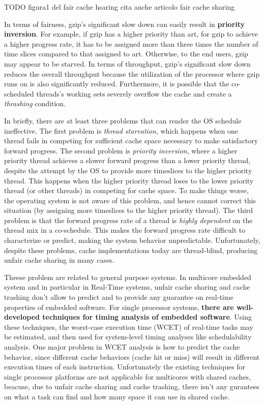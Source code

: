 \documentclass[a4paper,10pt]{article}
\begin{document}
\begin{multicols}{2}
TODO figura1 del fair cache hsaring cita anche articolo fair cache sharing


In terms of fairness, gzip's significant slow down can easily result in \textbf{priority inversion}. 
For example, if gzip has a higher priority than art, for gzip to achieve a higher progress rate, it has to be assigned more than three times the 
number of time slices compared to that assigned to art. Otherwise, to the end users, gzip may appear to be starved. In terms of throughput,
gzip's significant slow down reduces the overall throughput because the utilization of the processor where gzip runs on is also significantly reduced. 
Furthermore, it is possible that the co-scheduled threads's working sets severely overflow the cache and create a \textit{thrashing} condition.

In briefly, there are at least three problems that can render the OS schedule ineffective.
The first problem is \textit{thread starvation}, which happens when one thread fails in competing for sufficient cache space necessary to make 
satisfactory forward progress. The second problem is \textit{priority inversion}, where a higher priority thread achieves a slower forward
progress than a lower priority thread, despite the attempt by the OS to provide more timeslices to the higher priority thread.
This happens when the higher priority thread loses to the lower priority thread (or other threads) in competing
for cache space. To make things worse, the operating system is not aware of this problem, and hence cannot correct this situation 
(by assigning more timeslices to the higher priority thread). The third problem is that the forward progress
rate of a thread is \textit{highly dependent} on the thread mix in a co-schedule. This makes the forward progress rate difficult
to characterize or predict, making the system behavior unpredictable. Unfortunately, despite these problems, cache implementations today are 
thread-blind, producing unfair cache sharing in many cases.

Theese problem are related to general purpose systems. In multicore embedded system and in particular in Real-Time systems, unfair cache sharing 
and cache trashing don't allow to predict and to provide any guarantee on real-time properties of embedded software.
For single processor systems, \textbf{there are well-developed techniques for timing analysis of embedded software}.
Using these techniques, the worst-case execution time (WCET) of real-time tasks may be estimated, and then used for system-level 
timing analyses like schedulability analysis. One major problem in  WCET analysis is how to predict the cache behavior,
since different cache behaviors (cache hit or miss) will result in different execution times of each instruction.
Unfortunately the existing techniques for single processor platforms are not applicable for multicores with shared caches,
beacuse, due to unfair cache sharing and cache trashing, there isn't any gurantees on what a task can find and how many space it can use in shared cache.


\end{multicols}
\end{document}
